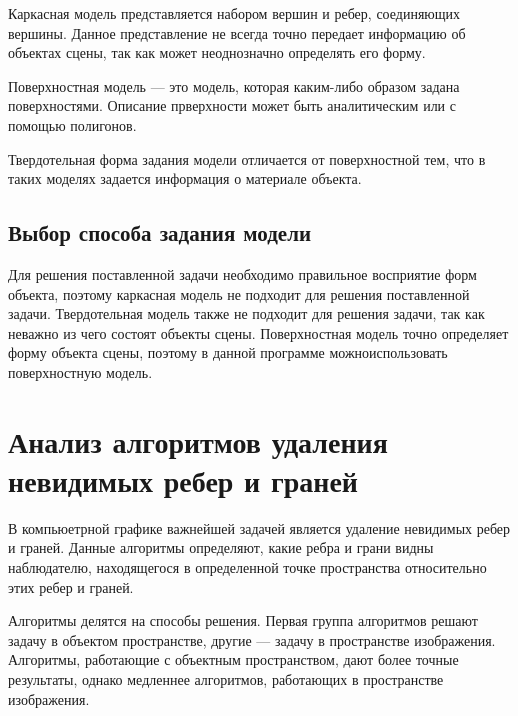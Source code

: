 
Каркасная модель представляется набором вершин и ребер, соединяющих вершины.
Данное представление не всегда точно передает информацию об объектах сцены,
так как может неоднозначно определять его форму.


Поверхностная модель --- это модель, которая каким-либо образом задана поверхностями.
Описание прверхности может быть аналитическим или с помощью полигонов.


Твердотельная форма задания модели отличается от поверхностной тем, что в таких моделях
задается информация о материале объекта.

\subsection{Выбор способа задания модели}

Для решения поставленной задачи необходимо правильное восприятие форм объекта, поэтому
каркасная модель не подходит для решения поставленной задачи. Твердотельная модель также не
подходит для решения задачи, так как неважно из чего состоят объекты сцены. Поверхностная
модель точно определяет форму объекта сцены, поэтому в данной программе можноиспользовать
поверхностную модель.


\section{Анализ алгоритмов удаления невидимых ребер и граней}

В компьюетрной графике важнейшей задачей является удаление невидимых ребер и граней.
Данные алгоритмы определяют, какие ребра и грани видны наблюдателю, находящегося
в определенной точке пространства относительно этих ребер и граней.

Алгоритмы делятся на способы решения. Первая группа алгоритмов решают задачу
в объектом пространстве, другие --- задачу в пространстве изображения.
Алгоритмы, работающие с объектным пространством,  дают более точные результаты,
однако медленнее алгоритмов, работающих в пространстве изображения.

